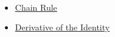 \begin{remark*}[Dependencies]~\\
\begin{itemize}
  \item \hyperref[thm:chain-rule]{Chain Rule}
  \item \hyperref[prop:derivative-identity]{Derivative of the Identity}
\end{itemize}
\end{remark*}